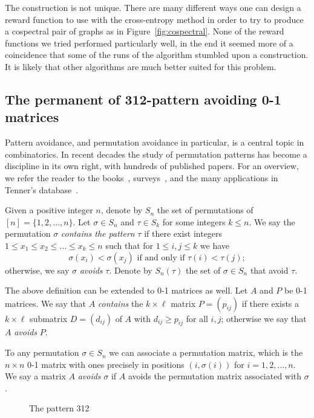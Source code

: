 \documentclass[11pt,english]{article}
\theoremstyle{plain}
\theoremstyle{remark}
\begin{document}
The construction is not unique. There are many different ways one can design a reward function to use with the cross-entropy method in order to try to produce a cospectral pair of graphs as in Figure~\ref{fig:cospectral}. None of the reward functions we tried performed particularly well, in the end it seemed more of a coincidence that some of the runs of the algorithm stumbled upon a construction. It is likely that other algorithms are much better suited for this problem.




\subsection{The permanent of 312-pattern avoiding 0-1 matrices}\label{subsec:perm312}

Pattern avoidance, and permutation avoidance in particular, is a central topic in combinatorics. In recent decades the study of permutation patterns has become a
discipline in its own right, with hundreds of published papers. For an overview, we refer the reader to the books~\cite{permbook1,permbook2}, surveys~\cite{permsurvey1,permsurvey2}, and the many applications in Tenner’s database~\cite{tenner}.

Given a positive integer $n$, denote by $S_n$ the set of permutations of $[n]=\{1,2,\ldots,n\}$. Let $\sigma\in S_n$ and $\tau\in S_k$ for some integers $k\leq n$. We say the permutation $\sigma$ \emph{contains the pattern} $\tau$ if there exist integers $1\leq x_1\leq x_2\leq \ldots \leq x_k\leq n$ such that for $1\leq i,j\leq k$ we have
$$\sigma(x_i) < \sigma(x_j) \text{ if and only if } \tau(i)< \tau(j);$$ otherwise, we say $\sigma$ \emph{avoids} $\tau$. Denote by $S_n(\tau)$ the set of $\sigma\in S_n$ that avoid $\tau$.

The above definition can be extended to 0-1 matrices as well. Let $A$ and $P$ be 0-1 matrices. We say that $A$ \emph{contains} the $k \times \ell$ matrix $P=(p_{ij})$ if there exists a $k \times \ell$ submatrix $D = (d_{ij})$ of $A$ with $d_{ij}\geq p_{ij}$ for all $i,j$; otherwise we say that $A$ \emph{avoids} $P$.

To any permutation $\sigma\in S_n$ we can associate a permutation matrix, which is the $n\times n$ 0-1 matrix with ones precisely in positions $(i,\sigma(i))$ for $i=1,2,\ldots,n$. We say a matrix $A$ \emph{avoids} $\sigma$ if $A$ avoids the permutation matrix associated with $\sigma$.

\begin{figure}[hbt]
    \centering

    \caption{The pattern 312}
    \label{fig:312}
\end{figure}
\end{document}
